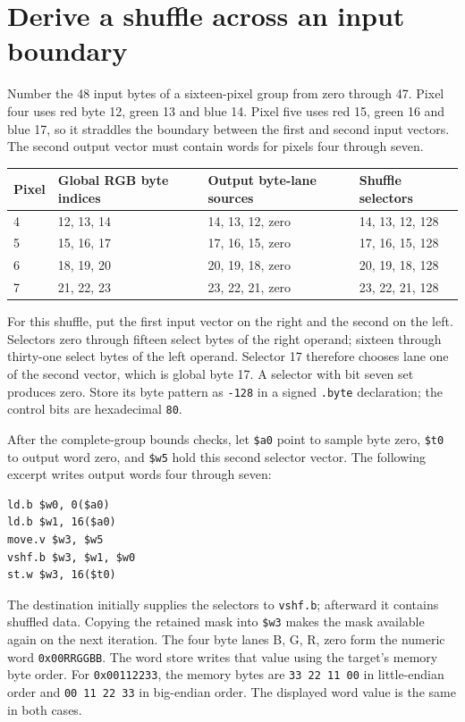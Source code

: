 \section{Derive a shuffle across an input boundary}
Number the 48 input bytes of a sixteen-pixel group from zero through 47. Pixel four
uses red byte 12, green 13 and blue 14. Pixel five uses red 15, green 16 and blue 17,
so it straddles the boundary between the first and second input vectors. The second
output vector must contain words for pixels four through seven.

\begin{longtable}{p{24mm}p{42mm}p{35mm}p{44mm}}
  \toprule Pixel & Global RGB byte indices & Output byte-lane sources & Shuffle selectors \\\midrule
  4              & 12, 13, 14              & 14, 13, 12, zero         & 14, 13, 12, 128   \\
  5              & 15, 16, 17              & 17, 16, 15, zero         & 17, 16, 15, 128   \\
  6              & 18, 19, 20              & 20, 19, 18, zero         & 20, 19, 18, 128   \\
  7              & 21, 22, 23              & 23, 22, 21, zero         & 23, 22, 21, 128   \\\bottomrule
\end{longtable}
For this shuffle, put the first input vector on the right and the second on the
left. Selectors zero through fifteen select bytes of the right operand; sixteen
through thirty-one select bytes of the left operand. Selector 17 therefore chooses
lane one of the second vector, which is global byte 17. A selector with bit seven
set produces zero. Store its byte pattern as \texttt{-128} in a signed
\texttt{.byte} declaration; the control bits are hexadecimal \texttt{80}.

After the complete-group bounds checks, let \texttt{\$a0} point to sample byte zero,
\texttt{\$t0} to output word zero, and \texttt{\$w5} hold this second selector vector.
The following excerpt writes output words four through seven:
\begin{verbatim}
ld.b $w0, 0($a0)
ld.b $w1, 16($a0)
move.v $w3, $w5
vshf.b $w3, $w1, $w0
st.w $w3, 16($t0)
\end{verbatim}
The destination initially supplies the selectors to \texttt{vshf.b}; afterward it
contains shuffled data. Copying the retained mask into \texttt{\$w3} makes the mask
available again on the next iteration. The four byte lanes B, G, R, zero form the
numeric word \texttt{0x00RRGGBB}. The word store writes that value using the target's
memory byte order. For \texttt{0x00112233}, the memory bytes are
\texttt{33 22 11 00} in little-endian order and \texttt{00 11 22 33} in big-endian
order. The displayed word value is the same in both cases.

